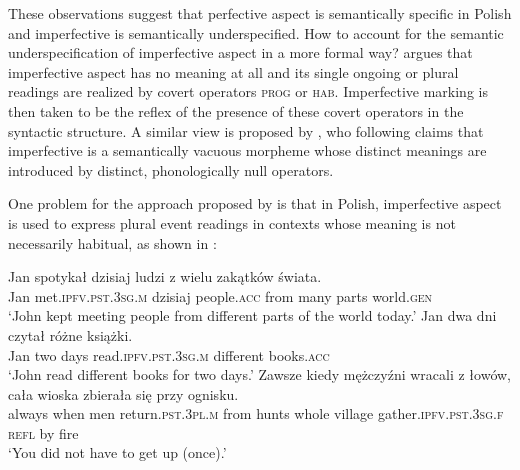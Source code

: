 \documentclass[output=paper]{langscibook}
\begin{document}
\noindent These observations suggest that perfective aspect is semantically specific in Polish and imperfective is semantically underspecified. How to account for the semantic underspecification of imperfective aspect in a more formal way? \citet{Hacquard2006} argues that imperfective aspect has no meaning at all and its single ongoing or plural readings are realized by covert operators \textsc{prog} or \textsc{hab}. Imperfective marking is then taken to be the reflex of the presence of these covert operators in the syntactic structure. A similar view is proposed by \citet{Frąckowiak2015}, who following \citet{Hacquard2006} claims that imperfective is a semantically vacuous morpheme whose distinct meanings are introduced by distinct, phonologically null operators.

One problem for the approach proposed by \citet{Hacquard2006} is that in Polish, imperfective aspect is used to express plural event readings in contexts whose meaning is not necessarily habitual, as shown in :

\ea\label{jan-bla:fansb:kb:ex10}
\ea \gll Jan spotykał dzisiaj ludzi z wielu zakątków świata.\\  
       Jan met.\textsc{ipfv}.\textsc{pst}.\textsc{3sg}.\textsc{m} dzisiaj people.\textsc{acc} from many parts world.\textsc{gen}\\ 
\glt ‘John kept meeting people from different parts of the world today.’\label{jan-bla:fansb:kb:ex10a}
\ex \gll Jan dwa dni czytał różne książki. \\  
        Jan two days read.\textsc{ipfv}.\textsc{pst}.\textsc{3sg}.\textsc{m} different books.\textsc{acc}\\
\glt ‘John read different books for two days.’\label{jan-bla:fansb:kb:ex10b}
\ex \gll Zawsze kiedy mężczyźni wracali z łowów, cała wioska zbierała się przy ognisku.\\  
        always when men return.\textsc{pst}.\textsc{3pl}.\textsc{m} from hunts whole village gather.\textsc{ipfv.pst.3sg.f} \textsc{refl} by fire\\
\glt ‘You did not have to get up (once).’\label{jan-bla:fansb:kb:ex10c}
\z
\z
\end{document}
